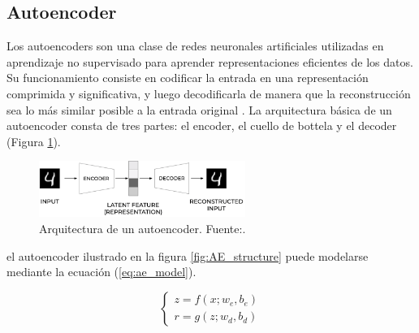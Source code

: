 \subsection{Autoencoder} \label{sec:ae}

Los autoencoders son una clase de redes neuronales artificiales utilizadas en aprendizaje no supervisado para aprender representaciones eficientes de los datos. Su funcionamiento consiste en codificar la entrada en una representación comprimida y significativa, y luego decodificarla de manera que la reconstrucción sea lo más similar posible a la entrada original \citep{lopes2022effective}. La arquitectura básica de un autoencoder consta de tres partes: el encoder, el cuello de bottela y el decoder (Figura \ref{fig:AE_architecture}). 


\begin{figure}[h]
    \centering
    \includegraphics[width=0.6\textwidth]{img/AE4.png}
    \caption{Arquitectura de un autoencoder. Fuente:\citep{autoencoderImage}.}
    \label{fig:AE_architecture}
\end{figure}




el autoencoder ilustrado en la figura \ref{fig:AE_structure} puede modelarse mediante la ecuación (\ref{eq:ae_model}).

\begin{equation}
\begin{cases}
z = f(x; w_e, b_e) \\
r = g(z; w_d, b_d)
\end{cases}
\label{eq:ae_model}
\end{equation}


